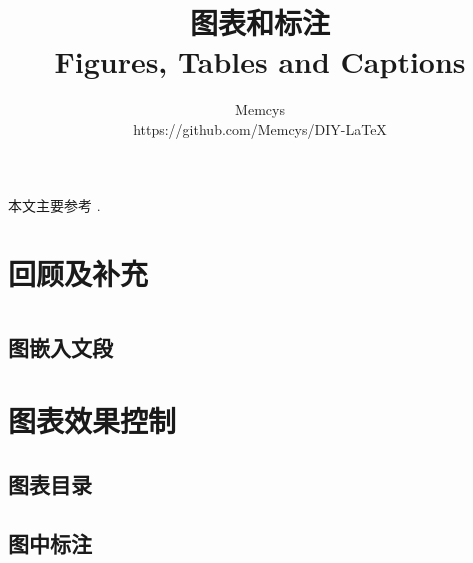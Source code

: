 \documentclass[]{ctexart}
\title{图表和标注 \\ Figures, Tables and Captions}
\author{Memcys \\ https://github.com/Memcys/DIY-LaTeX}
\begin{document}
\maketitle

本文主要参考 \cite{wiki:floats}.

\setcounter{section}{-1}
\section{回顾及补充}


\tableofcontents

\section[图]{}


\subsection{图嵌入文段}


\section[表格]{}


\section[标注]{}


\section{图表效果控制}
\subsection{图表目录}


\subsection[子浮动体]{}\label{sec:subfloats}


\subsection{图中标注}

\end{document}
